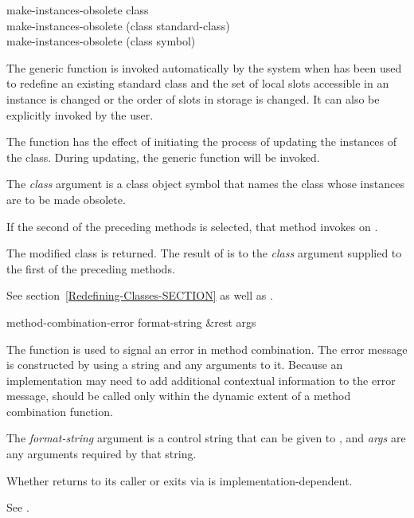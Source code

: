 \begin{defun}
make-instances-obsolete class \\
make-instances-obsolete (class standard-class) \\
make-instances-obsolete (class symbol)

The generic function  is invoked
automatically by the system when  has been used to
redefine an existing standard class and the set of local slots accessible in an
instance is changed or the order of slots in storage is changed.  It
can also be explicitly invoked by the user.

The function  has the effect of
initiating the process of updating the instances of the
class. During updating, the generic function 
 will be invoked.





The \emph{class\/} argument is a class object symbol that names
the class whose instances are to be made obsolete.

If the second of the preceding methods is selected, that method invokes
 on .


The modified class is returned.  The result of 
is  to the \emph{class} argument supplied to the first of the preceding
methods.

See section~\ref{Redefining-Classes-SECTION} as well as
.
\end{defun}



\begin{defun}[Function]
method-combination-error format-string &rest args

The function  is used to signal an error
in method combination.  The error message is constructed by using a
 string and any arguments to it.  Because an implementation may
need to add additional contextual information to the error message,
 should be called only within the
dynamic extent of a method combination function.



 

The \emph{format-string\/} argument is a control string that can be
given to , and \emph{args\/} are any arguments required by
that string.


Whether  returns to its caller or exits
via  is implementation-dependent.

See .

\end{defun}



